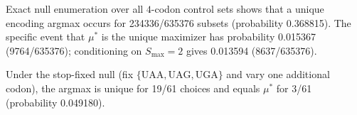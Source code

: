 Exact null enumeration over all $4$-codon control sets shows that a unique encoding argmax occurs for 234336/635376 subsets (probability 0.368815). The specific event that $\mu^\ast$ is the unique maximizer has probability 0.015367 (9764/635376); conditioning on $S_{\max}=2$ gives 0.013594 (8637/635376).

Under the stop-fixed null (fix $\{\mathrm{UAA,UAG,UGA}\}$ and vary one additional codon), the argmax is unique for 19/61 choices and equals $\mu^\ast$ for 3/61 (probability 0.049180).

